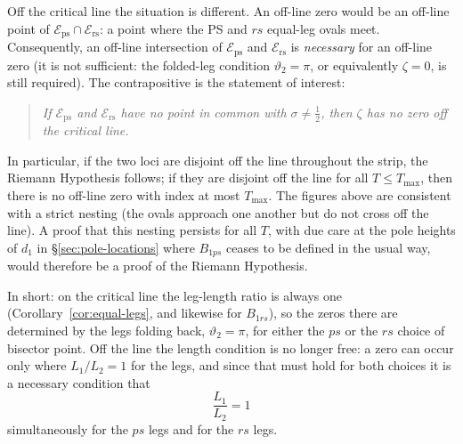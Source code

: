 \documentclass[11pt]{article}
\theoremstyle{definition}
\begin{document}
Off the critical line the situation is different. An off-line zero would be an
off-line point of $\mathcal{E}_{\mathrm{ps}}\cap\mathcal{E}_{\mathrm{rs}}$: a
point where the PS and $rs$ equal-leg ovals meet. Consequently, an off-line
intersection of $\mathcal{E}_{\mathrm{ps}}$ and $\mathcal{E}_{\mathrm{rs}}$ is
\emph{necessary} for an off-line zero (it is not sufficient: the folded-leg
condition $\vartheta_2=\pi$, or equivalently $\zeta=0$, is still required). The
contrapositive is the statement of interest:

\begin{quote}
\emph{If $\mathcal{E}_{\mathrm{ps}}$ and $\mathcal{E}_{\mathrm{rs}}$ have no
point in common with $\sigma\neq\tfrac12$, then $\zeta$ has no zero off the
critical line.}
\end{quote}

In particular, if the two loci are disjoint off the line throughout the strip,
the Riemann Hypothesis follows; if they are disjoint off the line for all
$T\le T_{\max}$, then there is no off-line zero with index at most $T_{\max}$.
The figures above are consistent with a strict nesting (the ovals approach one
another but do not cross off the line). A proof that this nesting persists for
all $T$, with due care at the pole heights of $d_1$ in
\S\ref{sec:pole-locations} where $B_{1ps}$ ceases to be defined in
the usual way, would therefore be a proof of the Riemann Hypothesis.

In short: on the critical line the leg-length ratio is always one
(Corollary~\ref{cor:equal-legs}, and likewise for $B_{1rs}$), so the
zeros there are determined by the legs folding back,
$\vartheta_2=\pi$, for either the $ps$ or the $rs$ choice of bisector point.
Off the line the length condition is no longer free: a zero can occur only
where $L_1/L_2=1$ for the legs, and since that must hold for both choices it
is a necessary condition that
\begin{equation}\label{eq:both-ratios-one}
\frac{L_1}{L_2}=1
\end{equation}
simultaneously for the $ps$ legs and for the $rs$ legs.
\end{document}
